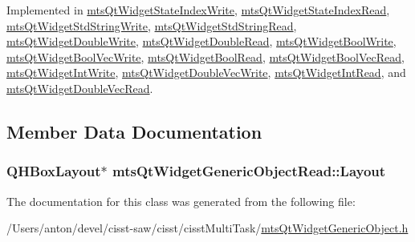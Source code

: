 Implemented in \hyperlink{classmts_qt_widget_state_index_write_a2c4ce9b09af6a20760a8ab643b5a77f8}{mts\+Qt\+Widget\+State\+Index\+Write}, \hyperlink{classmts_qt_widget_state_index_read_a55c12f3a2c8a6ab96d6763c3aca92aff}{mts\+Qt\+Widget\+State\+Index\+Read}, \hyperlink{classmts_qt_widget_std_string_write_a2bb0e3bd9ead0c8d1f45c4d850866c98}{mts\+Qt\+Widget\+Std\+String\+Write}, \hyperlink{classmts_qt_widget_std_string_read_a20892add108bb8f9a3623c9ba126e0dd}{mts\+Qt\+Widget\+Std\+String\+Read}, \hyperlink{classmts_qt_widget_double_write_a5f386ee1049f6153dcabc94c73f582f2}{mts\+Qt\+Widget\+Double\+Write}, \hyperlink{classmts_qt_widget_double_read_ac7feb0f4f219cad978349207ac6ce82a}{mts\+Qt\+Widget\+Double\+Read}, \hyperlink{classmts_qt_widget_bool_write_a5eb2213b3487392f77624abcd92872fc}{mts\+Qt\+Widget\+Bool\+Write}, \hyperlink{classmts_qt_widget_bool_vec_write_a330ae4e994be8862142e21d11310f1ca}{mts\+Qt\+Widget\+Bool\+Vec\+Write}, \hyperlink{classmts_qt_widget_bool_read_a916f37e2dff54320e2e5050f1b883c7b}{mts\+Qt\+Widget\+Bool\+Read}, \hyperlink{classmts_qt_widget_bool_vec_read_ab385467a11d1691bb1c09a17c2ff06f4}{mts\+Qt\+Widget\+Bool\+Vec\+Read}, \hyperlink{classmts_qt_widget_int_write_a757a7ade2b4bb02c0674cc9c99db907b}{mts\+Qt\+Widget\+Int\+Write}, \hyperlink{classmts_qt_widget_double_vec_write_acff9753bae2e9ad21c9fca44f26c0300}{mts\+Qt\+Widget\+Double\+Vec\+Write}, \hyperlink{classmts_qt_widget_int_read_a5c55cabb0365136fe77a339f20f2080b}{mts\+Qt\+Widget\+Int\+Read}, and \hyperlink{classmts_qt_widget_double_vec_read_a112d5ff2ff3b8d502470565da3df3d88}{mts\+Qt\+Widget\+Double\+Vec\+Read}.



\subsection{Member Data Documentation}
\hypertarget{classmts_qt_widget_generic_object_read_ad10c07d124b999b3f16522a6c6eb3789}{}
\subsubsection[{Layout}]{\setlength{\rightskip}{0pt plus 5cm}Q\+H\+Box\+Layout$\ast$ mts\+Qt\+Widget\+Generic\+Object\+Read\+::\+Layout\hspace{0.3cm}{\ttfamily [protected]}}\label{classmts_qt_widget_generic_object_read_ad10c07d124b999b3f16522a6c6eb3789}


The documentation for this class was generated from the following file\+:\begin{DoxyCompactItemize}
\item 
/\+Users/anton/devel/cisst-\/saw/cisst/cisst\+Multi\+Task/\hyperlink{mts_qt_widget_generic_object_8h}{mts\+Qt\+Widget\+Generic\+Object.\+h}\end{DoxyCompactItemize}
